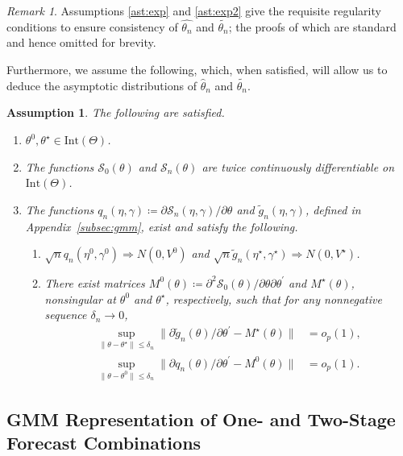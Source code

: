 \documentclass[12pt]{article}
\newtheorem{assumption}{Assumption}
\theoremstyle{definition}
\theoremstyle{remark}
\newtheorem{remark}{Remark}
\renewcommand{\appendixname}{Appendix}
\begin{document}
\begin{remark}
Assumptions \ref{ast:exp} and \ref{ast:exp2} give the requisite regularity conditions to ensure consistency of $\hat{\theta_{n}}$ and $\tilde{\theta_{n}}$; the proofs of which are standard and hence omitted for brevity.
\end{remark}

Furthermore, we assume the following, which, when satisfied, will allow us to deduce the asymptotic distributions of $\hat\theta_{n}$ and $\tilde{\theta_{n}}$.

\begin{assumption}
\label{ast:dist}
The following are satisfied.

\begin{enumerate}
\item $\theta^0, \theta^{\star} \in \mathrm{Int}(\Theta)$.
\item The functions $\mathcal{S}_0(\theta)$ and $\mathcal{S}_{n}(\theta)$ are twice continuously differentiable on $\text{Int}(\Theta)$.
\item The functions $q_{n}(\eta,\gamma) \coloneqq \partial \mathcal{S}_{n}(\eta,\gamma)/\partial\theta$ and $\tilde{g}_{n}(\eta,\gamma)$, defined in \appendixname\ \ref{subsec:gmm}, exist and satisfy the following.
\begin{enumerate}
\item $\sqrt{n} q_{n}(\eta^0, \gamma^0) \Rightarrow N(0, V^0)$ and $\sqrt{n} \tilde{g}_{n}(\eta^\star, \gamma^\star) \Rightarrow N(0, V^\star)$.

\item There exist matrices $M^0(\theta) \coloneqq \partial^2 \mathcal{S}_0(\theta)/\partial \theta \partial \theta^{\prime}$ and $M^\star(\theta)$, nonsingular at $\theta^0$ and $\theta^\star$, respectively, such that for any nonnegative sequence $\delta_n \to 0$, 
\begin{align*}
\sup_{\| \theta - \theta^\star \| \leq \delta_n} \| \partial \tilde{g}_{n}(\theta)/\partial\theta^{\prime} - M^\star(\theta) \| &= o_p(1), \\
\sup_{\| \theta - \theta^0 \| \leq \delta_n} \| \partial {q}_{n}(\theta) / \partial \theta^{\prime}-M^0(\theta)\| &= o_p(1).
\end{align*}
\end{enumerate}
\end{enumerate}
\end{assumption}

\subsection{GMM Representation of One- and Two-Stage Forecast Combinations\label{subsec:gmm}}
\end{document}
